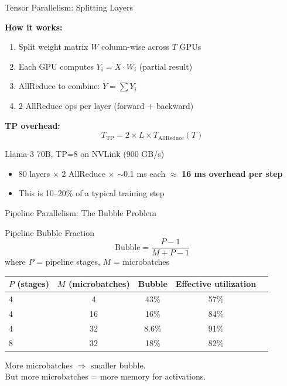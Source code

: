 \documentclass[aspectratio=169, 12pt]{beamer}
\newcommand{\wallbox}[2]{%
  \begin{block}{#1}#2\end{block}%
}
\begin{document}
\begin{frame}{Tensor Parallelism: Splitting Layers}

\small
\textbf{How it works:}
\begin{enumerate}\setlength\itemsep{2pt}
  \item Split weight matrix $W$ column-wise across $T$ GPUs
  \item Each GPU computes $Y_i = X \cdot W_i$ (partial result)
  \item AllReduce to combine: $Y = \sum Y_i$
  \item \alert{2 AllReduce ops per layer} (forward + backward)
\end{enumerate}

\vspace{0.3cm}
\textbf{TP overhead:}
\[
  T_{\text{TP}} = 2 \times L \times T_{\text{AllReduce}}(T)
\]

\begin{exampleblock}{Llama-3 70B, TP=8 on NVLink (900 GB/s)}
  \begin{itemize}
    \item 80 layers $\times$ 2 AllReduce $\times$ $\sim$0.1 ms each $\approx$ \textbf{16 ms overhead per step}
    \item This is 10--20\% of a typical training step
  \end{itemize}
\end{exampleblock}
\end{frame}

\begin{frame}{Pipeline Parallelism: The Bubble Problem}

\small
\wallbox{Pipeline Bubble Fraction}{
\[
  \text{Bubble} = \frac{P - 1}{M + P - 1}
\]
where $P$ = pipeline stages, $M$ = microbatches
}

\vspace{0.3cm}
\scriptsize
\begin{tabular}{lcccc}
\toprule
$P$ (stages) & $M$ (microbatches) & Bubble & Effective utilization \\
\midrule
4 & 4 & 43\% & 57\% \\
4 & 16 & 16\% & 84\% \\
4 & 32 & 8.6\% & 91\% \\
8 & 32 & 18\% & 82\% \\
\bottomrule
\end{tabular}

\normalsize
\vspace{0.2cm}
\alert{More microbatches $\Rightarrow$ smaller bubble.\\
But more microbatches = more memory for activations.}
\end{frame}
\end{document}
